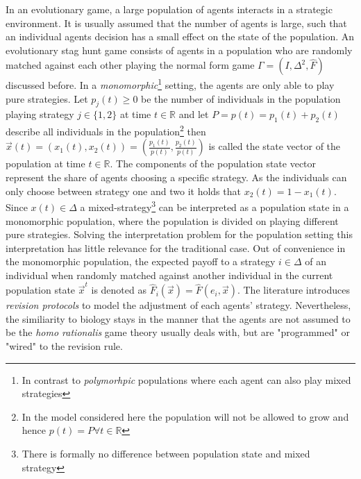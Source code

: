 \documentclass[11pt]{article}
\newcommand{\realnumb}{\mathbb{R}}
\begin{document}
In an evolutionary game, a large population of agents interacts in a 
strategic environment. It is usually assumed that the number of agents is 
large, such that an individual agents decision has a small effect on the
state of the population. 
An evolutionary stag hunt game consists of agents in a population who
are randomly matched against each other playing the normal form game 
$\Gamma = (I,\Delta^2,\hat{F})$ discussed before. In a \textit{monomorphic}\footnote{In 
contrast to \textit{polymorhpic} populations where each agent can also 
play mixed strategies} setting, the agents are only able to play pure 
strategies. Let $p_j(t) \geq 0$ be the number of individuals in the population
playing strategy $j \in \{1,2\}$ at time $t \in \realnumb$ and 
let $P = p(t) = p_1(t) + p_2(t)$ describe all individuals 
in the population\footnote{In the model considered here the population will 
not be allowed to grow and hence $p(t) = P \forall t \in \realnumb$}
then $\vec{x}(t) = \left(x_1(t),x_2(t)\right)
=\left(\frac{p_1(t)}{p(t)},\frac{p_2(t)}{p(t)}\right)$ 
is called the state vector of the population at
time $t \in \realnumb$. The components of the population state vector represent
the share of agents choosing a specific strategy. 
As the individuals can only choose between strategy one and two it holds that 
$x_2(t) = 1-x_1(t)$. Since $x(t) \in \Delta$ a 
mixed-strategy\footnote{There is formally no difference between population 
state and mixed strategy} can 
be interpreted as a population state in a monomorphic population, where the 
population is divided on playing different pure strategies. 
Solving the interpretation problem for the population setting this 
interpretation has little relevance for the traditional case. 
Out of convenience in the monomorphic population, the expected payoff 
to a strategy $i \in \Delta$ of an individual when randomly matched
against another individual in the current population state $\vec{x}^t$ 
is denoted as $\hat{F}_i(\vec{x}) = \hat{F}(e_i,\vec{x})$.
The literature introduces \textit{revision protocols} to model the adjustment 
of each agents' strategy. Nevertheless, the similiarity to biology stays in 
the manner that the agents are not assumed to be the \textit{homo rationalis} 
game theory usually deals with, but are "programmed" or "wired" 
\parencite{gintis_game_2000} to the revision rule.
\end{document}
